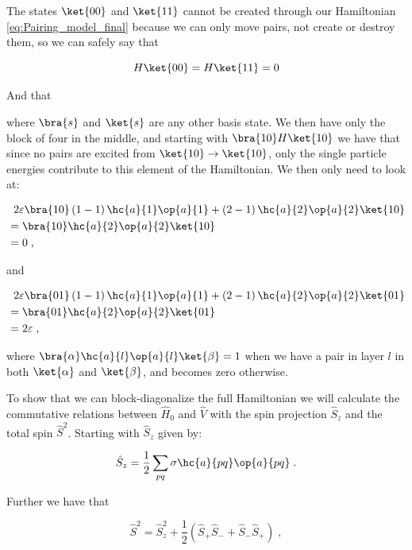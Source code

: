 The states $\ket{00}$ and $\ket{11}$ cannot be created through our Hamiltonian \ref{eq:Pairing_model_final} because we can only move pairs, not create or destroy them, so we can safely say that 

$$ H \ket{00} = H\ket{11} = 0$$

And that

where $\bra{s}$ and $\ket{s}$ are any other basis state. We then have only the block of four in the middle, and starting with $\bra{10}H\ket{10}$ we have that since no pairs are excited from $\ket{10} \rightarrow \ket{10}$, only the single particle energies contribute to this element of the Hamiltonian. We then only need to look at:

\begin{align*}
 &\; \; 2\varepsilon\bra{10}  \left (1 - 1 \right) \hc{a}{1}\op{a}{1} + \left (2 - 1 \right) \hc{a}{2}\op{a}{2} \ket{10} \\
 &= \bra{10} \hc{a}{2}\op{a}{2} \ket{10} \\
 &= 0
 \; ,
\end{align*}

and

\begin{align*}
 &\; \; 2\varepsilon\bra{01}  \left (1 - 1 \right) \hc{a}{1}\op{a}{1} + \left (2 - 1 \right) \hc{a}{2}\op{a}{2} \ket{01} \\
 &= \bra{01} \hc{a}{2}\op{a}{2} \ket{01} \\
 &= 2\varepsilon
 \; ,
\end{align*}

where $\bra{\alpha} \hc{a}{l}\op{a}{l} \ket{\beta} = 1$ when we have a pair in layer $l$ in both $\ket{\alpha}$ and $\ket{\beta}$, and becomes zero otherwise. 

To show that we can block-diagonalize the full Hamiltonian we will calculate the commutative relations between $\hat{H}_0$ and $\hat{V}$ with the spin projection $\hat{S}_z$ and the total spin $\hat{S}^2$. Starting with $\hat{S}_z$ given by:

\begin{equation}
  \hat{S}_z = \frac{1}{2}\sum_{pq} \sigma \hc{a}{pq}\op{a}{pq}\; .
  \label{eq:s_z}
\end{equation}

Further we have that

\begin{equation}
  \hat{S}^2 = \hat{S}_z^2 + \frac{1}{2} \left(\hat{S}_+\hat{S}_- + \hat{S}_-\hat{S}_+\right) \; ,
  \label{eq:s_2}
\end{equation}

